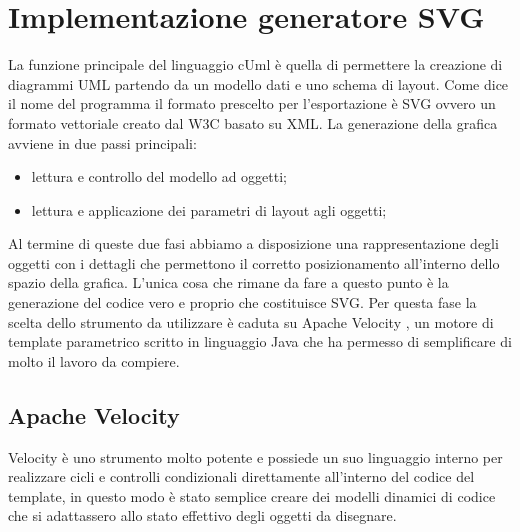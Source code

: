 \section{Implementazione generatore SVG}

La funzione principale del linguaggio cUml è quella di permettere la creazione 
di diagrammi UML partendo da un modello dati e uno schema di layout.
Come dice il nome del programma il formato prescelto per l'esportazione è SVG
\cite{svg_website:8} ovvero un formato vettoriale creato dal W3C
\cite{w3c_website:9} basato su XML.
La generazione della grafica avviene in due passi principali:
\begin{itemize}
  \item lettura e controllo del modello ad oggetti;
  \item lettura e applicazione dei parametri di layout agli oggetti;
\end{itemize}

Al termine di queste due fasi abbiamo a disposizione una rappresentazione degli
oggetti con i dettagli che permettono il corretto posizionamento all'interno
dello spazio della grafica.
L'unica cosa che rimane da fare a questo punto è la generazione del codice vero
e proprio che costituisce SVG. Per questa fase la scelta dello strumento da
utilizzare è caduta su Apache Velocity \cite{apache_velocity_website:7}, un
motore di 
template parametrico scritto in linguaggio Java che ha permesso di semplificare
di molto il lavoro da compiere.

\subsection{Apache Velocity}
Velocity è uno strumento molto potente e possiede un suo linguaggio interno per
realizzare cicli e controlli condizionali direttamente all'interno del codice
del template, in questo modo è stato semplice creare dei modelli dinamici di
codice che si adattassero allo stato effettivo degli oggetti da disegnare.

